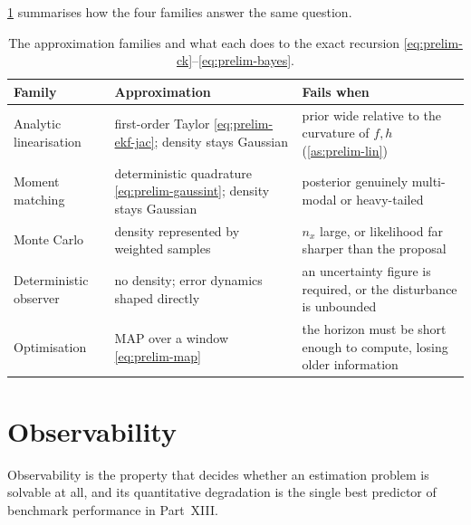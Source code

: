 \cref{tab:prelim-roadmap} summarises how the four families answer the same question.

\begin{table}[H]\centering
\caption{The approximation families and what each does to the exact recursion
\eqref{eq:prelim-ck}--\eqref{eq:prelim-bayes}.}
\label{tab:prelim-roadmap}
\small
\begin{tabular}{@{}p{30mm}p{52mm}p{50mm}@{}}\toprule
Family & Approximation & Fails when \\ \midrule
Analytic linearisation & first-order Taylor \eqref{eq:prelim-ekf-jac}; density stays Gaussian &
 prior wide relative to the curvature of $f,h$ (\cref{as:prelim-lin}) \\
Moment matching & deterministic quadrature \eqref{eq:prelim-gaussint}; density stays Gaussian &
 posterior genuinely multi-modal or heavy-tailed \\
Monte Carlo & density represented by weighted samples &
 $n_x$ large, or likelihood far sharper than the proposal \\
Deterministic observer & no density; error dynamics shaped directly &
 an uncertainty figure is required, or the disturbance is unbounded \\
Optimisation & MAP over a window \eqref{eq:prelim-map} &
 the horizon must be short enough to compute, losing older information \\
\bottomrule\end{tabular}
\end{table}

\section{Observability}
\label{sec:prelim-obs}

Observability is the property that decides whether an estimation problem is solvable at all,
and its quantitative degradation is the single best predictor of benchmark performance in
Part~XIII.

